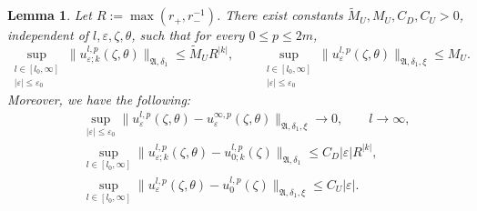 \documentclass[reqno,11pt]{amsart}
\newtheorem{lemma}{Lemma}[section]
\begin{document}
\begin{lemma}\label{lem:uest}
Let $R:=\max(r_+,r_-^{-1})$. There exist constants $\widetilde M_U,M_U,C_D,C_U>0$,
independent of $l,\varepsilon,\zeta,\theta$, such that for every
$0\le p\le 2m$,
\begin{equation}\label{equ:basisbound}
\sup_{\substack{l\in[l_0,\infty]\\ |\varepsilon|\le \varepsilon_0}}
\|u^{l,p}_{\varepsilon;k}(\zeta,\theta)\|_{\mathfrak A,\delta_1}
\le\widetilde M_U R^{|k|},
\qquad \sup_{\substack{l\in[l_0,\infty]\\ |\varepsilon|\le \varepsilon_0}}
\|u^{l,p}_{\varepsilon}(\zeta,\theta)\|_{\mathfrak A,\delta_1,\xi}
\le M_U.
\end{equation} 
Moreover, we have the following: 
\begin{eqnarray}
\label{equ:basiscon}
&&\sup_{|\varepsilon|\le \varepsilon_0}
\|u^{l,p}_{\varepsilon}(\zeta,\theta)-
u^{\infty,p}_{\varepsilon}(\zeta,\theta)\|_{\mathfrak A,\delta_1,\xi}
\longrightarrow 0,
\qquad l\to\infty, \\
\label{equ:basiszero}
&&\sup_{l\in[l_0,\infty]}
\|u^{l,p}_{\varepsilon;k}(\zeta,\theta)
-u^{l,p}_{0;k}(\zeta)\|_{\mathfrak A,\delta_1}\le
C_D |\varepsilon| R^{|k|},\\
\label{equ:basisper}
&&\sup_{l\in[l_0,\infty]}
\|u^{l,p}_{\varepsilon}(\zeta,\theta)
-u^{l,p}_{0}(\zeta)\|_{\mathfrak A,\delta_1,\xi}
\le C_U |\varepsilon|.
\end{eqnarray}
\end{lemma}
\end{document}
